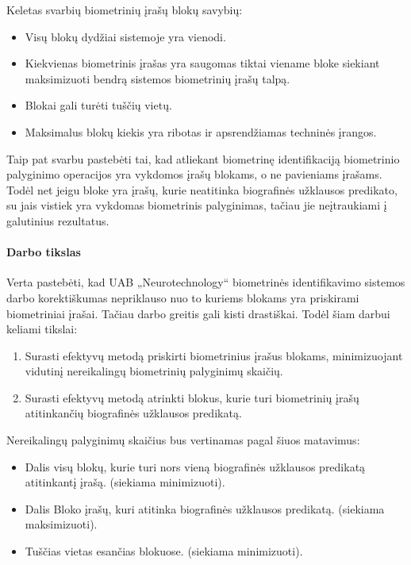 Keletas svarbių biometrinių įrašų blokų savybių:
\begin{itemize}
\item Visų blokų dydžiai sistemoje yra vienodi.
\item Kiekvienas biometrinis įrašas yra saugomas tiktai viename bloke siekiant maksimizuoti bendrą sistemos biometrinių įrašų talpą.
\item Blokai gali turėti tuščių vietų.
\item Maksimalus blokų kiekis yra ribotas ir apsrendžiamas techninės įrangos.
\end{itemize}

Taip pat svarbu pastebėti tai, kad atliekant biometrinę identifikaciją biometrinio palyginimo operacijos yra vykdomos įrašų blokams, o ne pavieniams įrašams.
Todėl net jeigu bloke yra įrašų, kurie neatitinka biografinės užklausos predikato, su jais vistiek yra vykdomas biometrinis palyginimas, tačiau jie neįtraukiami į galutinius rezultatus.


\paragraph{Darbo tikslas}

Verta pastebėti, kad UAB „Neurotechnology“ biometrinės identifikavimo sistemos darbo korektiškumas nepriklauso nuo to kuriems blokams yra priskirami biometriniai įrašai.
Tačiau darbo greitis gali kisti drastiškai.
Todėl šiam darbui keliami tikslai:
\begin{enumerate}
	\item Surasti efektyvų metodą priskirti biometrinius įrašus blokams, minimizuojant vidutinį nereikalingų biometrinių palyginimų skaičių.
	\item Surasti efektyvų metodą atrinkti blokus, kurie turi biometrinių įrašų atitinkančių biografinės užklausos predikatą.
\end{enumerate}

Nereikalingų palyginimų skaičius bus vertinamas pagal šiuos matavimus:
\begin{itemize}
	\item Dalis visų blokų, kurie turi nors vieną biografinės užklausos predikatą atitinkantį įrašą. (siekiama minimizuoti).
	\item Dalis Bloko įrašų, kuri atitinka biografinės užklausos predikatą. (siekiama maksimizuoti).
	\item Tuščias vietas esančias blokuose. (siekiama minimizuoti).
\end{itemize}

